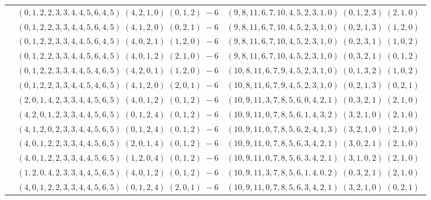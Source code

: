 \documentclass[11pt]{article}
\begin{document}
\begin{longtable}[l]{|c|c|c|}
 \cline{2-3} 
 & $(0 ,1 ,2 ,2 ,3 ,3 ,4 ,4 ,5 ,6 ,4 ,5) \;(4 ,2 ,1 ,0) \;(0 ,1 ,2) \;-6$ & $(9 ,8 ,11 ,6 ,7 ,10 ,4 ,5 ,2 ,3 ,1 ,0) \;(0 ,1 ,2 ,3) \;(2 ,1 ,0) \;$\\ 
 \cline{2-3} 
 & $(0 ,1 ,2 ,2 ,3 ,3 ,4 ,4 ,5 ,6 ,4 ,5) \;(4 ,1 ,2 ,0) \;(0 ,2 ,1) \;-6$ & $(9 ,8 ,11 ,6 ,7 ,10 ,4 ,5 ,2 ,3 ,1 ,0) \;(0 ,2 ,1 ,3) \;(1 ,2 ,0) \;$\\ 
 \cline{2-3} 
 & $(0 ,1 ,2 ,2 ,3 ,3 ,4 ,4 ,5 ,6 ,4 ,5) \;(4 ,0 ,2 ,1) \;(1 ,2 ,0) \;-6$ & $(9 ,8 ,11 ,6 ,7 ,10 ,4 ,5 ,2 ,3 ,1 ,0) \;(0 ,2 ,3 ,1) \;(1 ,0 ,2) \;$\\ 
 \cline{2-3} 
 & $(0 ,1 ,2 ,2 ,3 ,3 ,4 ,4 ,5 ,6 ,4 ,5) \;(4 ,0 ,1 ,2) \;(2 ,1 ,0) \;-6$ & $(9 ,8 ,11 ,6 ,7 ,10 ,4 ,5 ,2 ,3 ,1 ,0) \;(0 ,3 ,2 ,1) \;(0 ,1 ,2) \;$\\ 
 \cline{2-3} 
 & $(0 ,1 ,2 ,2 ,3 ,3 ,4 ,4 ,5 ,4 ,6 ,5) \;(4 ,2 ,0 ,1) \;(1 ,2 ,0) \;-6$ & $(10 ,8 ,11 ,6 ,7 ,9 ,4 ,5 ,2 ,3 ,1 ,0) \;(0 ,1 ,3 ,2) \;(1 ,0 ,2) \;$\\ 
 \cline{2-3} 
 & $(0 ,1 ,2 ,2 ,3 ,3 ,4 ,4 ,5 ,4 ,6 ,5) \;(4 ,1 ,2 ,0) \;(2 ,0 ,1) \;-6$ & $(10 ,8 ,11 ,6 ,7 ,9 ,4 ,5 ,2 ,3 ,1 ,0) \;(0 ,2 ,1 ,3) \;(0 ,2 ,1) \;$\\ 
 \cline{2-3} 
 & $(2 ,0 ,1 ,4 ,2 ,3 ,3 ,4 ,4 ,5 ,6 ,5) \;(4 ,0 ,1 ,2) \;(0 ,1 ,2) \;-6$ & $(10 ,9 ,11 ,3 ,7 ,8 ,5 ,6 ,0 ,4 ,2 ,1) \;(0 ,3 ,2 ,1) \;(2 ,1 ,0) \;$\\ 
 \cline{2-3} 
 & $(4 ,2 ,0 ,1 ,2 ,3 ,3 ,4 ,4 ,5 ,6 ,5) \;(0 ,1 ,2 ,4) \;(0 ,1 ,2) \;-6$ & $(10 ,9 ,11 ,0 ,7 ,8 ,5 ,6 ,1 ,4 ,3 ,2) \;(3 ,2 ,1 ,0) \;(2 ,1 ,0) \;$\\ 
 \cline{2-3} 
 & $(4 ,1 ,2 ,0 ,2 ,3 ,3 ,4 ,4 ,5 ,6 ,5) \;(0 ,1 ,2 ,4) \;(0 ,1 ,2) \;-6$ & $(10 ,9 ,11 ,0 ,7 ,8 ,5 ,6 ,2 ,4 ,1 ,3) \;(3 ,2 ,1 ,0) \;(2 ,1 ,0) \;$\\ 
 \cline{2-3} 
 & $(4 ,0 ,1 ,2 ,2 ,3 ,3 ,4 ,4 ,5 ,6 ,5) \;(2 ,0 ,1 ,4) \;(0 ,1 ,2) \;-6$ & $(10 ,9 ,11 ,0 ,7 ,8 ,5 ,6 ,3 ,4 ,2 ,1) \;(3 ,0 ,2 ,1) \;(2 ,1 ,0) \;$\\ 
 \cline{2-3} 
 & $(4 ,0 ,1 ,2 ,2 ,3 ,3 ,4 ,4 ,5 ,6 ,5) \;(1 ,2 ,0 ,4) \;(0 ,1 ,2) \;-6$ & $(10 ,9 ,11 ,0 ,7 ,8 ,5 ,6 ,3 ,4 ,2 ,1) \;(3 ,1 ,0 ,2) \;(2 ,1 ,0) \;$\\ 
 \cline{2-3} 
 & $(1 ,2 ,0 ,4 ,2 ,3 ,3 ,4 ,4 ,5 ,6 ,5) \;(4 ,0 ,1 ,2) \;(0 ,1 ,2) \;-6$ & $(10 ,9 ,11 ,3 ,7 ,8 ,5 ,6 ,1 ,4 ,0 ,2) \;(0 ,3 ,2 ,1) \;(2 ,1 ,0) \;$\\ 
 \cline{2-3} 
 & $(4 ,0 ,1 ,2 ,2 ,3 ,3 ,4 ,4 ,5 ,6 ,5) \;(0 ,1 ,2 ,4) \;(2 ,0 ,1) \;-6$ & $(10 ,9 ,11 ,0 ,7 ,8 ,5 ,6 ,3 ,4 ,2 ,1) \;(3 ,2 ,1 ,0) \;(0 ,2 ,1) \;$\\ 

\end{longtable}
\end{document}
